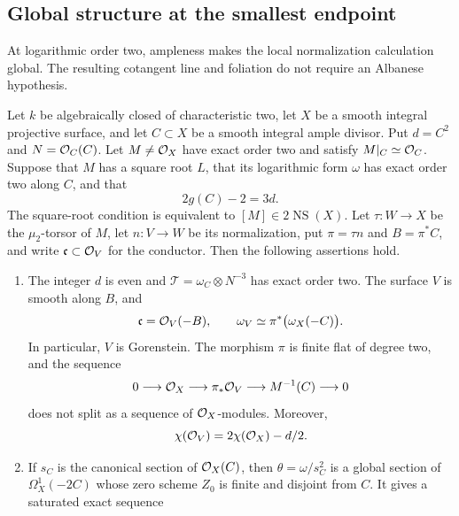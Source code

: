 \subsection{Global structure at the smallest endpoint}
\label{subsec:smallest-endpoint-global-structure}

At logarithmic order two, ampleness makes the local normalization
calculation global.  The resulting cotangent line and foliation do
not require an Albanese hypothesis.

\begin{theorem}
\label{thm:smallest-endpoint-global-structure}
Let $k$ be algebraically closed of characteristic two, let $X$ be a
smooth integral projective surface, and let $C\subset X$ be a smooth
integral ample divisor.  Put $d=C^2$ and $N=\mathcal O_C(C)$.  Let
$M\ne\mathcal O_X$ have exact order two and satisfy $M|_C\simeq\mathcal O_C$.
Suppose that $M$ has a square root $L$, that its logarithmic form
$\omega$ has exact order two along $C$, and that
\[
 2g(C)-2=3d.
\]
The square-root condition is equivalent to
$[M]\in2\operatorname{NS}(X)$.
Let $\tau:W\to X$ be the $\mu_2$-torsor of $M$,
let $n:V\to W$ be its normalization, put $\pi=\tau n$ and
$B=\pi^*C$, and write $\mathfrak c\subset\mathcal O_V$ for the conductor.
Then the following assertions hold.
\begin{enumerate}
\item The integer $d$ is even and
      $\mathcal T=\omega_C\otimes N^{-3}$ has exact order two.
      The surface $V$ is smooth along $B$, and
      \begin{equation}\label{eq:smallest-endpoint-global-conductor}
       \mathfrak c=\mathcal O_V(-B),\qquad
       \omega_V\simeq\pi^*\bigl(\omega_X(-C)\bigr).
      \end{equation}
      In particular, $V$ is Gorenstein.  The morphism $\pi$ is finite
      flat of degree two, and the sequence
      \begin{equation}\label{eq:smallest-endpoint-global-cover-sequence}
       0\longrightarrow\mathcal O_X\longrightarrow\pi_*\mathcal O_V
       \longrightarrow M^{-1}(C)\longrightarrow0
      \end{equation}
      does not split as a sequence of $\mathcal O_X$-modules.  Moreover,
      \[
       \chi(\mathcal O_V)=2\chi(\mathcal O_X)-d/2.
      \]
\item If $s_C$ is the canonical section of $\mathcal O_X(C)$, then
      $\theta=\omega/s_C^2$ is a global section of
      $\Omega_X^1(-2C)$ whose zero scheme $Z_0$ is finite and disjoint
      from $C$.  It gives a saturated exact sequence

\end{enumerate}
\end{theorem}
